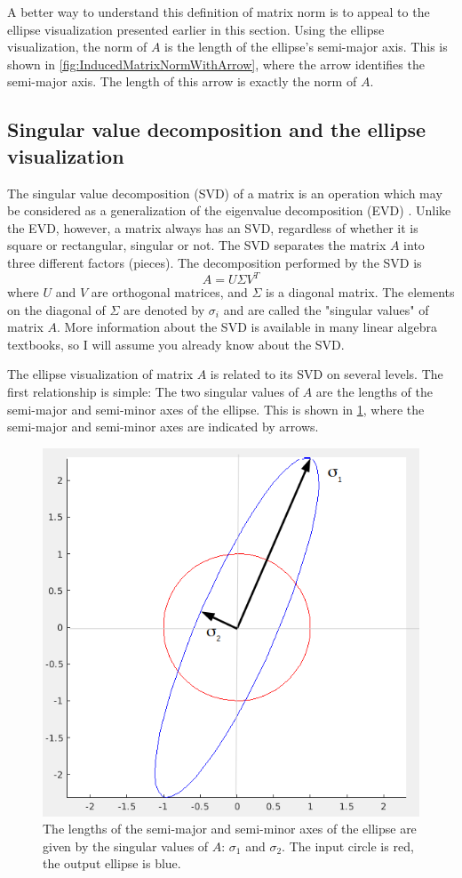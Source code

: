 \documentclass[onefignum,onetabnum]{siamart190516}
\begin{document}
A better way to understand this definition of matrix norm is to appeal
to the ellipse visualization presented earlier in this section.
Using the ellipse visualization, the norm of $A$ is the length
of the ellipse's semi-major axis.  
This is shown in 
\cref{fig:InducedMatrixNormWithArrow}, 
where the arrow identifies the semi-major axis. 
The length of this arrow is exactly 
the norm of $A$.

\subsection{Singular value decomposition and the ellipse visualization}
The singular value decomposition (SVD) of a matrix is an operation
which may be considered as a generalization of the eigenvalue
decomposition (EVD) \cite{higham2020_svd}.   Unlike the EVD, however, a matrix always has an
SVD, regardless of whether it is square or rectangular, singular or
not.  The SVD separates the
matrix $A$ into three different factors (pieces).  The decomposition performed
by the SVD is
$$
A = U \Sigma V^T
$$
where $U$ and $V$ are orthogonal matrices, and $\Sigma$ is a diagonal matrix.
The elements on the diagonal of $\Sigma$ are denoted by $\sigma_i$ and are
called the "singular values" of matrix $A$.  More information about the
SVD is available in many linear algebra textbooks, so I will assume
you already know about the SVD.


The ellipse visualization of matrix $A$ is related to its SVD on several
levels.  The first relationship is simple:  The two singular values of
$A$ are the lengths of the semi-major and semi-minor axes of the
ellipse.  This is shown in \cref{fig:EllipseAxes}, where the semi-major and
semi-minor axes are indicated by arrows.
\begin{figure}[H]
	\centering
	\includegraphics[width=0.8\columnwidth]{EllipseAxes.png}
	\caption{The lengths of the semi-major and semi-minor axes of the ellipse
		are given by the singular values of $A$: $\sigma_1$ and $\sigma_2$.
		The input circle is red, the output ellipse is blue.}
	\label{fig:EllipseAxes}
\end{figure}
\FloatBarrier
\end{document}
